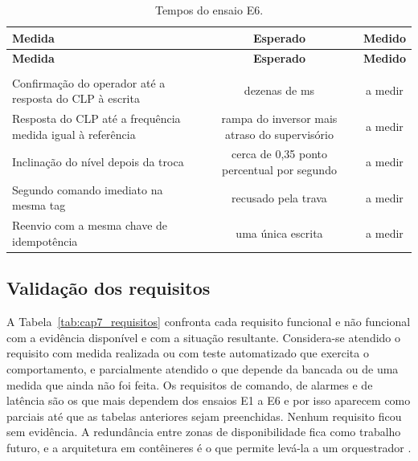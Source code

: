 
{\renewcommand{\arraystretch}{1.3}\small
\begin{xltabular}{\textwidth}{Xcc}
        \caption{Tempos do ensaio E6.}
        \label{tab:cap7_e6}\\
        \hline
        \textbf{Medida} & \textbf{Esperado} & \textbf{Medido} \\
        \hline
        \endfirsthead
        \hline
        \textbf{Medida} & \textbf{Esperado} & \textbf{Medido} \\
        \hline
        \endhead
        \endfoot
         \\
        \endlastfoot
        Confirmação do operador até a resposta do CLP à escrita & dezenas de ms & a medir \\
        \hline
        Resposta do CLP até a frequência medida igual à referência & rampa do inversor mais atraso do supervisório & a medir \\
        \hline
        Inclinação do nível depois da troca & cerca de 0,35 ponto percentual por segundo & a medir \\
        \hline
        Segundo comando imediato na mesma tag & recusado pela trava & a medir \\
        \hline
        Reenvio com a mesma chave de idempotência & uma única escrita & a medir \\
        \hline
\end{xltabular}}


\subsection{Validação dos requisitos}

\par A Tabela~\ref{tab:cap7_requisitos} confronta cada requisito funcional e não funcional com a evidência disponível e com a situação resultante. Considera-se atendido o requisito com medida realizada ou com teste automatizado que exercita o comportamento, e parcialmente atendido o que depende da bancada ou de uma medida que ainda não foi feita. Os requisitos de comando, de alarmes e de latência são os que mais dependem dos ensaios E1 a E6 e por isso aparecem como parciais até que as tabelas anteriores sejam preenchidas. Nenhum requisito ficou sem evidência. A redundância entre zonas de disponibilidade fica como trabalho futuro, e a arquitetura em contêineres é o que permite levá-la a um orquestrador \cite{NETTO2017_COORDENACAO_CONTAINERS_KUBERNETES}.

